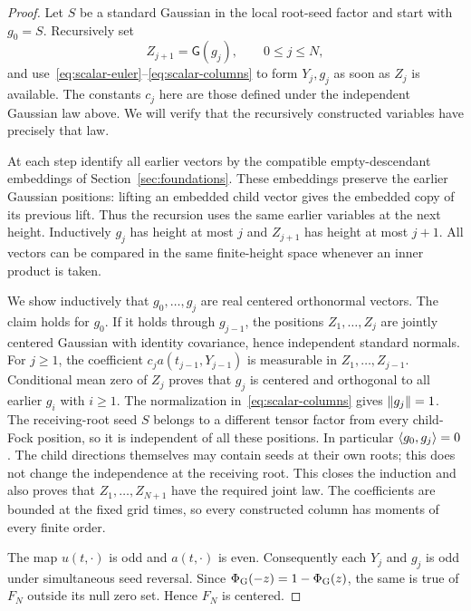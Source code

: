 \begin{proof}
Let $S$ be a standard Gaussian in the local root-seed factor and
start with $g_0=S$. Recursively set
\[
 Z_{j+1}=\mathsf G(g_j),\qquad 0\le j\le N,
\]
and use~\eqref{eq:scalar-euler}--\eqref{eq:scalar-columns} to form
$Y_j,g_j$ as soon as $Z_j$ is available. The constants $c_j$ here
are those defined under the independent Gaussian law above.
We will verify that the recursively constructed variables have
precisely that law.

At each step identify all earlier vectors by the compatible
empty-descendant embeddings of Section~\ref{sec:foundations}.
These embeddings preserve the earlier Gaussian positions:
lifting an embedded child vector gives the embedded copy of its
previous lift. Thus the recursion uses the same earlier variables
at the next height. Inductively $g_j$ has height at most $j$ and
$Z_{j+1}$ has height at most $j+1$. All vectors can be compared
in the same finite-height space whenever an inner product is taken.

We show inductively that $g_0,\ldots,g_j$ are real centered
orthonormal vectors. The claim holds for $g_0$. If it holds through
$g_{j-1}$, the positions $Z_1,\ldots,Z_j$ are jointly centered
Gaussian with identity covariance, hence independent standard
normals. For $j\ge1$, the coefficient
$c_j a(t_{j-1},Y_{j-1})$ is measurable in
$Z_1,\ldots,Z_{j-1}$. Conditional mean zero of $Z_j$ proves that
$g_j$ is centered and orthogonal to all earlier $g_i$ with $i\ge1$.
The normalization in~\eqref{eq:scalar-columns} gives
$\lVert g_j\rVert=1$. The receiving-root seed $S$ belongs to a different
tensor factor from every child-Fock position, so it is independent
of all these positions. In particular
$\langle g_0,g_j\rangle=0$.
The child directions themselves may contain seeds at their own
roots; this does not change the independence at the receiving root.
This closes the induction and also proves that
$Z_1,\ldots,Z_{N+1}$ have the required joint law. The coefficients
are bounded at the fixed grid times, so every constructed column
has moments of every finite order.

The map $u(t,\cdot)$ is odd and $a(t,\cdot)$ is even. Consequently
each $Y_j$ and $g_j$ is odd under simultaneous seed reversal.
Since $\Phi_{\rm G}(-z)=1-\Phi_{\rm G}(z)$, the same is true of
$F_N$ outside its null zero set. Hence $F_N$ is centered.


\end{proof}
